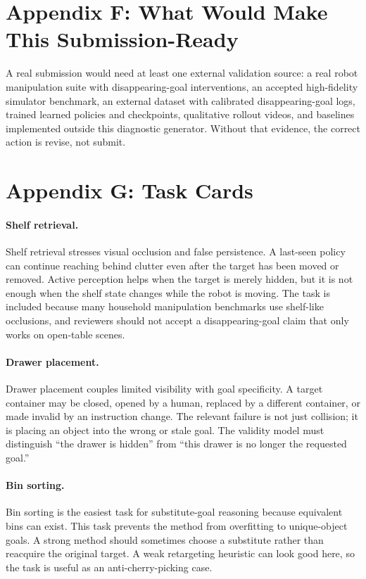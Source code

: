\documentclass{article}
\begin{document}
\section{Appendix F: What Would Make This Submission-Ready}
A real submission would need at least one external validation source: a real robot manipulation suite with disappearing-goal interventions, an accepted high-fidelity simulator benchmark, an external dataset with calibrated disappearing-goal logs, trained learned policies and checkpoints, qualitative rollout videos, and baselines implemented outside this diagnostic generator. Without that evidence, the correct action is revise, not submit.

\section{Appendix G: Task Cards}
\paragraph{Shelf retrieval.}
Shelf retrieval stresses visual occlusion and false persistence. A last-seen policy can continue reaching behind clutter even after the target has been moved or removed. Active perception helps when the target is merely hidden, but it is not enough when the shelf state changes while the robot is moving. The task is included because many household manipulation benchmarks use shelf-like occlusions, and reviewers should not accept a disappearing-goal claim that only works on open-table scenes.

\paragraph{Drawer placement.}
Drawer placement couples limited visibility with goal specificity. A target container may be closed, opened by a human, replaced by a different container, or made invalid by an instruction change. The relevant failure is not just collision; it is placing an object into the wrong or stale goal. The validity model must distinguish ``the drawer is hidden'' from ``this drawer is no longer the requested goal.''

\paragraph{Bin sorting.}
Bin sorting is the easiest task for substitute-goal reasoning because equivalent bins can exist. This task prevents the method from overfitting to unique-object goals. A strong method should sometimes choose a substitute rather than reacquire the original target. A weak retargeting heuristic can look good here, so the task is useful as an anti-cherry-picking case.
\end{document}
